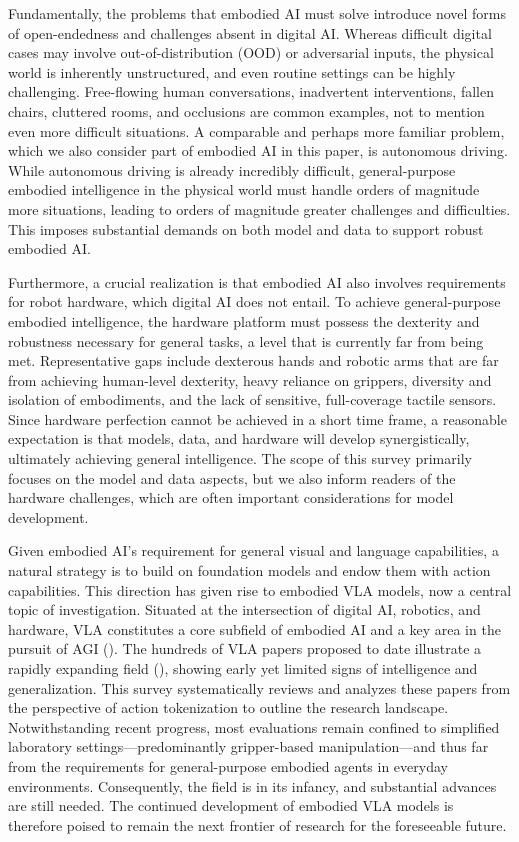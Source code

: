 \documentclass[10pt, a4paper, logo, copyright]{googledeepmind} %
\begin{document}
Fundamentally, the problems that embodied AI must solve introduce novel forms of open-endedness and challenges absent in digital AI. Whereas difficult digital cases may involve out-of-distribution (OOD) or adversarial inputs, the physical world is inherently unstructured, and even routine settings can be highly challenging. Free-flowing human conversations, inadvertent interventions, fallen chairs, cluttered rooms, and occlusions are common examples, not to mention even more difficult situations. A comparable and perhaps more familiar problem, which we also consider part of embodied AI in this paper, is autonomous driving. While autonomous driving is already incredibly difficult, general-purpose embodied intelligence in the physical world must handle orders of magnitude more situations, leading to orders of magnitude greater challenges and difficulties. This imposes substantial demands on both model and data to support robust embodied AI.

Furthermore, a crucial realization is that embodied AI also involves requirements for robot hardware, which digital AI does not entail. To achieve general-purpose embodied intelligence, the hardware platform must possess the dexterity and robustness necessary for general tasks, a level that is currently far from being met. Representative gaps include dexterous hands and robotic arms that are far from achieving human-level dexterity, heavy reliance on grippers, diversity and isolation of embodiments, and the lack of sensitive, full-coverage tactile sensors. Since hardware perfection cannot be achieved in a short time frame, a reasonable expectation is that models, data, and hardware will develop synergistically, ultimately achieving general intelligence. The scope of this survey primarily focuses on the model and data aspects, but we also inform readers of the hardware challenges, which are often important considerations for model development. 

Given embodied AI's requirement for general visual and language capabilities, a natural strategy is to build on foundation models and endow them with action capabilities. This direction has given rise to embodied VLA models, now a central topic of investigation. Situated at the intersection of digital AI, robotics, and hardware, VLA constitutes a core subfield of embodied AI and a key area in the pursuit of AGI (). The hundreds of VLA papers proposed to date illustrate a rapidly expanding field (), showing early yet limited signs of intelligence and generalization. This survey systematically reviews and analyzes these papers from the perspective of action tokenization to outline the research landscape. Notwithstanding recent progress, most evaluations remain confined to simplified laboratory settings---predominantly gripper-based manipulation---and thus far from the requirements for general-purpose embodied agents in everyday environments. Consequently, the field is in its infancy, and substantial advances are still needed. The continued development of embodied VLA models is therefore poised to remain the next frontier of research for the foreseeable future.
\end{document}

